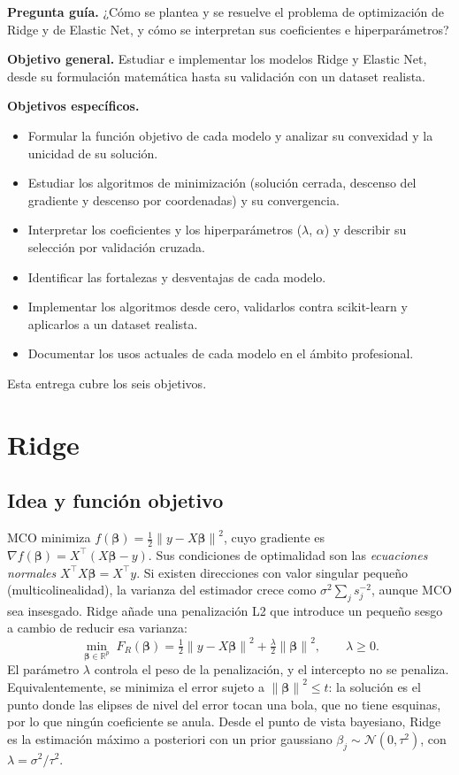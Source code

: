 \documentclass[11pt,a4paper]{article}
\newcommand{\R}{\mathbb{R}}
\newcommand{\norm}[1]{\left\lVert #1 \right\rVert}
\newcommand{\bt}{\bm{\beta}}
\theoremstyle{simple}
\begin{document}
\textbf{Pregunta guía.} ¿Cómo se plantea y se resuelve el problema de optimización de Ridge y de Elastic Net, y cómo se interpretan sus coeficientes e hiperparámetros?

\textbf{Objetivo general.} Estudiar e implementar los modelos Ridge y Elastic Net, desde su formulación matemática hasta su validación con un dataset realista.

\textbf{Objetivos específicos.}
\begin{itemize}
\item Formular la función objetivo de cada modelo y analizar su convexidad y la unicidad de su solución.
\item Estudiar los algoritmos de minimización (solución cerrada, descenso del gradiente y descenso por coordenadas) y su convergencia.
\item Interpretar los coeficientes y los hiperparámetros ($\lambda$, $\alpha$) y describir su selección por validación cruzada.
\item Identificar las fortalezas y desventajas de cada modelo.
\item Implementar los algoritmos desde cero, validarlos contra scikit-learn y aplicarlos a un dataset realista.
\item Documentar los usos actuales de cada modelo en el ámbito profesional.
\end{itemize}
Esta entrega cubre los seis objetivos.

\section{Ridge}\label{sec:ridge}

\subsection{Idea y función objetivo}
MCO minimiza $f(\bt)=\tfrac12\norm{y-X\bt}^2$, cuyo gradiente es $\nabla f(\bt)=X^\top(X\bt-y)$. Sus condiciones de optimalidad son las \emph{ecuaciones normales} $X^\top X\bt=X^\top y$. Si existen direcciones con valor singular pequeño (multicolinealidad), la varianza del estimador crece como $\sigma^2\sum_j s_j^{-2}$, aunque MCO sea insesgado. Ridge añade una penalización L2 que introduce un pequeño sesgo a cambio de reducir esa varianza:
\begin{equation}\label{eq:PR}
\min_{\bt\in\R^p}\; F_R(\bt)=\tfrac12\norm{y-X\bt}^2+\tfrac{\lambda}{2}\norm{\bt}^2,\qquad \lambda\ge0 .
\end{equation}
El parámetro $\lambda$ controla el peso de la penalización, y el intercepto no se penaliza. Equivalentemente, se minimiza el error sujeto a $\norm{\bt}^2\le t$: la solución es el punto donde las elipses de nivel del error tocan una bola, que no tiene esquinas, por lo que ningún coeficiente se anula. Desde el punto de vista bayesiano, Ridge es la estimación máximo a posteriori con un prior gaussiano $\beta_j\sim\mathcal N(0,\tau^2)$, con $\lambda=\sigma^2/\tau^2$.
\end{document}
